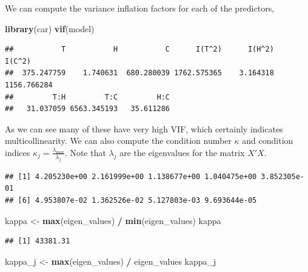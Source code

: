 \documentclass[
  11pt,
]{article}
\newenvironment{Shaded}{\begin{snugshade}}{\end{snugshade}}
\newcommand{\FunctionTok}[1]{\textcolor[rgb]{0.13,0.29,0.53}{\textbf{#1}}}
\newcommand{\NormalTok}[1]{#1}
\newcommand{\OtherTok}[1]{\textcolor[rgb]{0.56,0.35,0.01}{#1}}
\newcommand{\SpecialCharTok}[1]{\textcolor[rgb]{0.81,0.36,0.00}{\textbf{#1}}}
\begin{document}
We can compute the variance inflation factors for each of the
predictors,

\begin{Shaded}
\begin{Highlighting}[]
\FunctionTok{library}\NormalTok{(car)}
\FunctionTok{vif}\NormalTok{(model)}
\end{Highlighting}
\end{Shaded}

\begin{verbatim}
##           T           H           C      I(T^2)      I(H^2)      I(C^2) 
##  375.247759    1.740631  680.280039 1762.575365    3.164318 1156.766284 
##         T:H         T:C         H:C 
##   31.037059 6563.345193   35.611286
\end{verbatim}

As we can see many of these have very high VIF, which certainly
indicates multicollinearity. We can also compute the condition number
\(\kappa\) and condition indices
\(\kappa_j = \frac{\lambda_{\max}}{\lambda_j}\). Note that \(\lambda_j\)
are the eigenvalues for the matrix \(X'X\).

\begin{Shaded}
\end{Shaded}

\begin{verbatim}
## [1] 4.205230e+00 2.161999e+00 1.138677e+00 1.040475e+00 3.852305e-01
## [6] 4.953807e-02 1.362526e-02 5.127803e-03 9.693644e-05
\end{verbatim}

\begin{Shaded}
\begin{Highlighting}[]
\NormalTok{kappa }\OtherTok{\textless{}{-}} \FunctionTok{max}\NormalTok{(eigen\_values) }\SpecialCharTok{/} \FunctionTok{min}\NormalTok{(eigen\_values)}
\NormalTok{kappa}
\end{Highlighting}
\end{Shaded}

\begin{verbatim}
## [1] 43381.31
\end{verbatim}

\begin{Shaded}
\begin{Highlighting}[]
\NormalTok{kappa\_j }\OtherTok{\textless{}{-}} \FunctionTok{max}\NormalTok{(eigen\_values) }\SpecialCharTok{/}\NormalTok{ eigen\_values}
\NormalTok{kappa\_j}
\end{Highlighting}
\end{Shaded}
\end{document}

